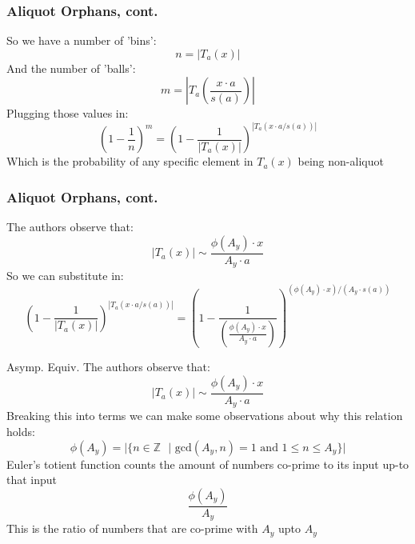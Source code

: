 \documentclass{beamer}
\begin{document}





\begin{frame}
\frametitle{Aliquot Orphans, cont.}
So we have a number of 'bins': $$n = |T_a(x)|$$ 
And the number of 'balls': $$m = |T_a\left(\frac{x\cdot a}{s(a)} \right)|$$ 
Plugging those values in: $$\left(1-\frac{1}{n}\right)^m = \left(1-\frac{1}{|T_a(x)|}\right)^{|T_a(x\cdot a/s(a))|} $$
Which is the probability of any specific element in $T_a(x)$ being non-aliquot
\end{frame}

\begin{frame}
\frametitle{Aliquot Orphans, cont.}

The authors observe that: $$|T_a(x)|  \sim  \frac{\phi(A_y) \cdot x}{ A_y \cdot a}$$ So we can substitute in: 
$$ \left(1-\frac{1}{|T_a(x)|}\right)^{|T_a(x\cdot a/s(a))|} = \left(1-\frac{1}{\left(\frac{\phi(A_y) \cdot x}{ A_y \cdot a}\right)}\right)^{(\phi(A_y) \cdot x)/( A_y \cdot s(a))}$$
\end{frame}

\begin{frame}{Asymp. Equiv.}
The authors observe that:
    $$|T_a(x)|  \sim  \frac{\phi(A_y) \cdot x}{ A_y \cdot a}$$
    Breaking this into terms we can make some observations about why this relation holds:
    $$\phi(A_y) = |\{n \in \mathbb{Z} \text{ } | \text{ gcd}(A_y,n) = 1 \text{ and } 1 \leq n \leq A_y \}|$$
    Euler's totient function counts the amount of numbers co-prime to its input up-to that input
    $$ \frac{\phi(A_y)}{ A_y }$$
    This is the ratio of numbers that are co-prime with $A_y$ upto $A_y$
\end{frame}
\end{document}
